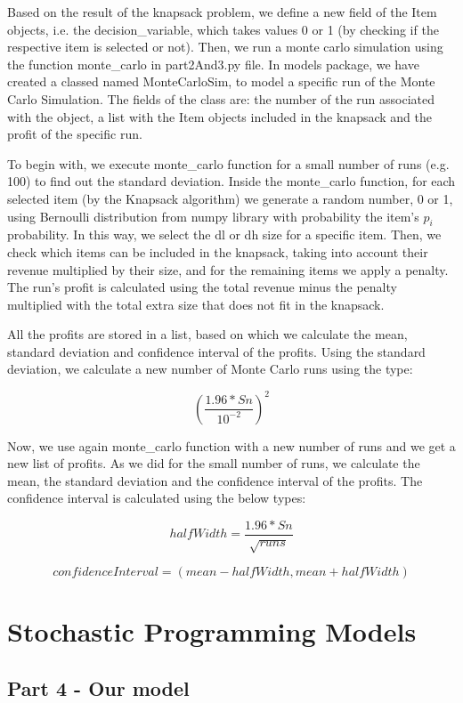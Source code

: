 \documentclass[12pt]{article}
\begin{document}
    Based on the result of the knapsack problem, we define a new field of the Item objects, i.e. the decision\_variable, which takes values 0 or 1 (by checking if the respective item is selected or not). Then, we run a monte carlo simulation using the function monte\_carlo in part2And3.py file. In models package, we have created a classed named MonteCarloSim, to model a specific run of the Monte Carlo Simulation. The fields of the class are: the number of the run associated with the object, a list with the Item objects included in the knapsack and the profit of the specific run.
    
    To begin with, we execute monte\_carlo function for a small number of runs (e.g. 100) to find out the standard deviation. Inside the monte\_carlo function, for each selected item (by the Knapsack algorithm) we generate a random number, 0 or 1, using Bernoulli distribution from numpy library with probability the item's $p_i$ probability. In this way, we select the dl or dh size for a specific item. Then, we check which items can be included in the knapsack, taking into account their revenue multiplied by their size, and for the remaining items we apply a penalty. The run's profit is calculated using the total revenue minus the penalty multiplied with the total extra size that does not fit in the knapsack.
    
    All the profits are stored in a list, based on which we calculate the mean, standard deviation and confidence interval of the profits. Using the standard deviation, we calculate a new number of Monte Carlo runs using the type:
    
    $$ (\frac{1.96 * Sn}{10 ^ {-2}})^ 2 $$
    
    Now, we use again monte\_carlo function with a new number of runs and we get a new list of profits. As we did for the small number of runs, we calculate the mean, the standard deviation and the confidence interval of the profits. The confidence interval is calculated using the below types:
    
    $$ halfWidth = \frac{1.96 * Sn}{\sqrt{runs}} $$
    
    $$ confidenceInterval = (mean - halfWidth, mean + halfWidth) $$
    
    \section{Stochastic Programming Models}
    
    \subsection{Part 4 - Our model}
    
\end{document}
